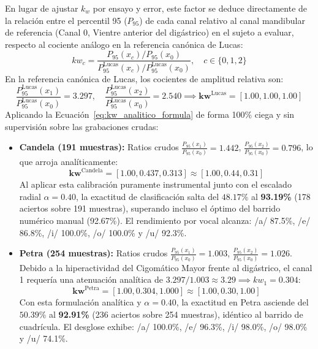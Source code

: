 \documentclass[11pt,a4paper]{article}
\begin{document}
En lugar de ajustar $k_w$ por ensayo y error, este factor se deduce directamente de la relación entre el percentil 95 ($P_{95}$) de cada canal relativo al canal mandibular de referencia (Canal 0, Vientre anterior del digástrico) en el sujeto a evaluar, respecto al cociente análogo en la referencia canónica de Lucas:
\begin{equation}
kw_c = \frac{P_{95}(x_c) / P_{95}(x_0)}{P_{95}^{\text{Lucas}}(x_c) / P_{95}^{\text{Lucas}}(x_0)}, \quad c \in \{0, 1, 2\}
\label{eq:kw_analitico_formula}
\end{equation}
En la referencia canónica de Lucas, los cocientes de amplitud relativa son:
\begin{equation}
\frac{P_{95}^{\text{Lucas}}(x_1)}{P_{95}^{\text{Lucas}}(x_0)} = 3.297, \quad \frac{P_{95}^{\text{Lucas}}(x_2)}{P_{95}^{\text{Lucas}}(x_0)} = 2.540 \implies \mathbf{kw}^{\text{Lucas}} = [1.00, 1.00, 1.00]
\end{equation}
Aplicando la Ecuación~\eqref{eq:kw_analitico_formula} de forma 100\% ciega y sin supervisión sobre las grabaciones crudas:
\begin{itemize}
    \item \textbf{Candela (191 muestras):} Ratios crudos $\frac{P_{95}(x_1)}{P_{95}(x_0)} = 1.442$, $\frac{P_{95}(x_2)}{P_{95}(x_0)} = 0.796$, lo que arroja analíticamente:
    \begin{equation}
    \mathbf{kw}^{\text{Candela}} = [1.00, 0.437, 0.313] \approx [1.00, 0.44, 0.31]
    \end{equation}
    Al aplicar esta calibración puramente instrumental junto con el escalado radial $\alpha = 0.40$, la exactitud de clasificación salta del $48.17\%$ al \textbf{93.19\%} (178 aciertos sobre 191 muestras), superando incluso el óptimo del barrido numérico manual (92.67\%). El rendimiento por vocal alcanza: /a/ 87.5\%, /e/ 86.8\%, /i/ 100.0\%, /o/ 100.0\% y /u/ 92.3\%.
    \item \textbf{Petra (254 muestras):} Ratios crudos $\frac{P_{95}(x_1)}{P_{95}(x_0)} = 1.003$, $\frac{P_{95}(x_2)}{P_{95}(x_0)} = 1.026$. Debido a la hiperactividad del Cigomático Mayor frente al digástrico, el canal 1 requería una atenuación analítica de $3.297 / 1.003 \approx 3.29 \implies kw_1 = 0.304$:
    \begin{equation}
    \mathbf{kw}^{\text{Petra}} = [1.00, 0.304, 1.000] \approx [1.00, 0.30, 1.00]
    \end{equation}
    Con esta formulación analítica y $\alpha = 0.40$, la exactitud en Petra asciende del $50.39\%$ al \textbf{92.91\%} (236 aciertos sobre 254 muestras), idéntico al barrido de cuadrícula. El desglose exhibe: /a/ 100.0\%, /e/ 96.3\%, /i/ 98.0\%, /o/ 98.0\% y /u/ 74.1\%.
\end{itemize}
\end{document}
